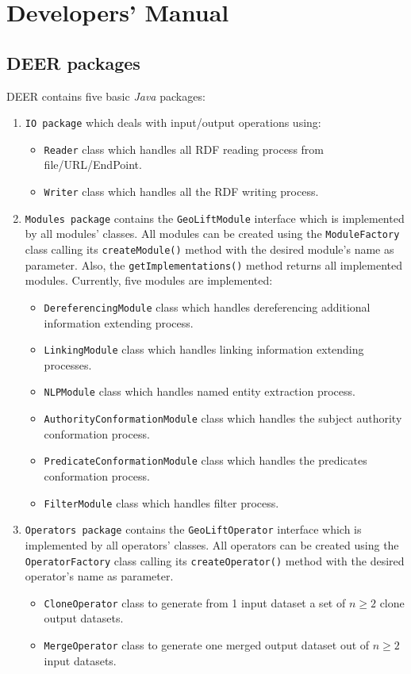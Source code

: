 \documentclass[a4paper,twoside,bibtotoc,abstracton,12pt,BCOR=15mm]{article}
\newcommand{\geolift}{\textsc{DEER}\xspace}
\begin{document}
\section{Developers' Manual}

\subsection{\geolift packages}
\geolift contains five basic \emph{Java} packages: 
\begin{enumerate}
 \item \texttt{IO package} which deals with input/output operations using:
   \begin{itemize}
    \item \texttt{Reader} class which handles all RDF reading process from file/URL/EndPoint. 
    \item \texttt{Writer} class which handles all the RDF writing process. 
  \end{itemize}

  \item\texttt{Modules package} contains the \texttt{GeoLiftModule} interface which is implemented by all modules' classes.
      All modules can be created using the \texttt{ModuleFactory} class calling its \texttt{createModule()} method with the desired module's name as parameter.
      Also, the \texttt{getImplementations()} method returns all implemented modules.
      Currently, five modules are implemented:
      \begin{itemize}
	\item \texttt{DereferencingModule} class which handles dereferencing  additional information extending process. 
	\item \texttt{LinkingModule} class which handles linking information extending processes. 
	\item \texttt{NLPModule} class which handles named entity extraction process.
	\item \texttt{AuthorityConformationModule} class which handles the subject authority conformation process.
	\item \texttt{PredicateConformationModule} class which handles the predicates conformation process.
	\item \texttt{FilterModule} class which handles filter process.
      \end{itemize}
  
   \item \texttt{Operators package} contains the \texttt{GeoLiftOperator} interface which is implemented by all operators' classes.
    All operators can be created using the \texttt{OperatorFactory} class calling its \texttt{createOperator()} method with the desired operator's name as parameter.
      \begin{itemize}
	\item \texttt{CloneOperator} class to generate from 1 input dataset a set of $n \geq 2$ clone output datasets.
	\item \texttt{MergeOperator} class to generate one merged output dataset out of $n \geq 2$ input datasets.
      \end{itemize}
 

\end{enumerate}
\end{document}
